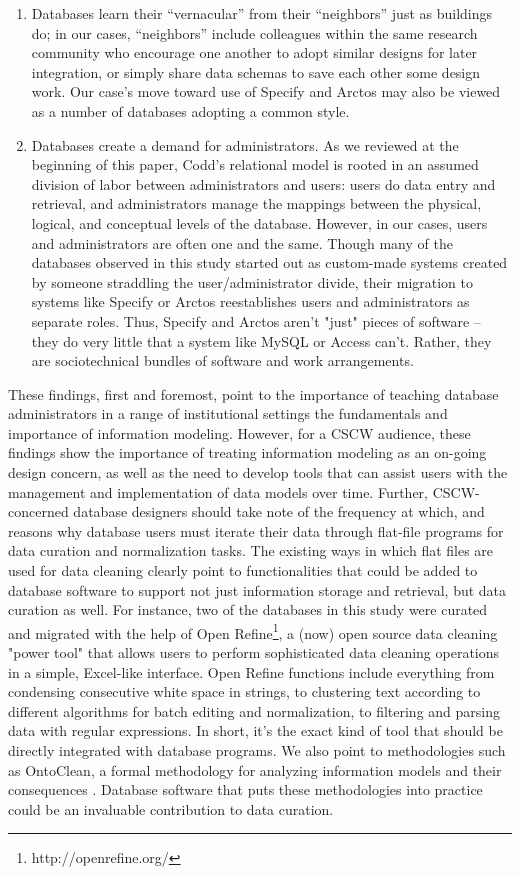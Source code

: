 \begin{enumerate}
\item Databases learn their “vernacular” from their “neighbors” just as buildings do; in our cases, “neighbors” include colleagues within the same research community who encourage one another to adopt similar designs for later integration, or simply share data schemas to save each other some design work. Our case’s move toward use of Specify and Arctos may also be viewed as a number of databases adopting a common style. 
\item Databases create a demand for administrators. As we reviewed at the beginning of this paper, Codd’s relational model is rooted in an assumed division of labor between administrators and users: users do data entry and retrieval, and administrators manage the mappings between the physical, logical, and conceptual levels of the database. However, in our cases, users and administrators are often one and the same. Though many of the databases observed in this study started out as custom-made systems created by someone straddling the user/administrator divide, their migration to systems like Specify or Arctos reestablishes users and administrators as separate roles. Thus, Specify and Arctos aren't "just" pieces of software -- they do very little that a system like MySQL or Access can't. Rather, they are sociotechnical bundles of software and work arrangements.
\end{enumerate}

These findings, first and foremost, point to the importance of teaching database administrators in a range of institutional settings the fundamentals and importance of information modeling. However, for a CSCW audience, these findings show the importance of treating information modeling as an on-going design concern, as well as the need to develop tools that can assist users with the management and implementation of data models over time. Further, CSCW-concerned database designers should take note of the frequency at which, and reasons why database users must iterate their data through flat-file programs for data curation and normalization tasks. The existing ways in which flat files are used for data cleaning clearly point to functionalities that could be added to database software to support not just information storage and retrieval, but data curation as well.  For instance, two of the databases in this study were curated and migrated with the help of Open Refine\footnote{http://openrefine.org/}, a (now) open source data cleaning "power tool" that allows users to perform sophisticated data cleaning operations in a simple, Excel-like interface. Open Refine functions include everything from condensing consecutive white space in strings, to clustering text according to different algorithms for batch editing and normalization, to filtering and parsing data with regular expressions. In short, it's the exact kind of tool that should be directly integrated with database programs. We also point to methodologies such as OntoClean, a formal methodology for analyzing information models and their consequences \cite{Guarino_2004}. Database software that puts these methodologies into practice could be an invaluable contribution to data curation.
